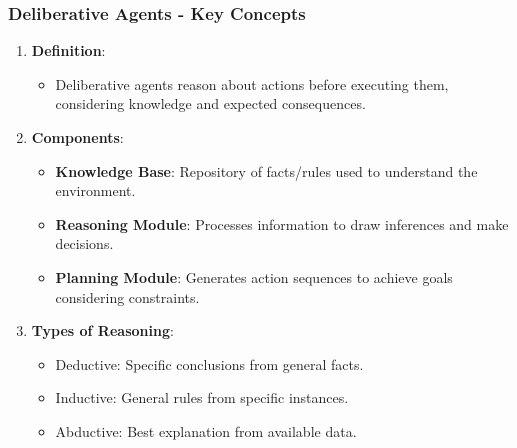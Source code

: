 \documentclass[aspectratio=169]{beamer}
\begin{document}
\begin{frame}[fragile]
    \frametitle{Deliberative Agents - Key Concepts}
    \begin{enumerate}
        \item \textbf{Definition}:
        \begin{itemize}
            \item Deliberative agents reason about actions before executing them, considering knowledge and expected consequences.
        \end{itemize}
        
        \item \textbf{Components}:
        \begin{itemize}
            \item \textbf{Knowledge Base}: Repository of facts/rules used to understand the environment.
            \item \textbf{Reasoning Module}: Processes information to draw inferences and make decisions.
            \item \textbf{Planning Module}: Generates action sequences to achieve goals considering constraints.
        \end{itemize}
        
        \item \textbf{Types of Reasoning}:
        \begin{itemize}
            \item Deductive: Specific conclusions from general facts.
            \item Inductive: General rules from specific instances.
            \item Abductive: Best explanation from available data.
        \end{itemize}
    \end{enumerate}
\end{frame}
\end{document}
